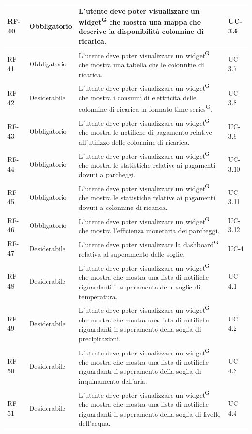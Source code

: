 \documentclass[8pt]{article}
\newcommand{\glossterm}[1]{#1\textsuperscript{G}} %
\begin{document}
\begin{longtable}{|>{\centering\arraybackslash}p{1.2cm}|>{\centering\arraybackslash}p{2cm}|>{\centering\arraybackslash}p{8.5cm}|>{\centering\arraybackslash}p{3cm}|}
            RF-40 & Obbligatorio & L'utente deve poter visualizzare un \glossterm{widget} che mostra una mappa che descrive la disponibilità colonnine di ricarica. & UC-3.6 \\ \hline
            RF-41 & Obbligatorio & L'utente deve poter visualizzare un \glossterm{widget} che mostra una tabella che le colonnine di ricarica. & UC-3.7 \\ \hline
            RF-42 & Desiderabile & L'utente deve poter visualizzare un \glossterm{widget} che mostra i consumi di elettricità delle colonnine di ricarica in formato \glossterm{time series}. & UC-3.8 \\ \hline
            RF-43 & Obbligatorio & L'utente deve poter visualizzare un \glossterm{widget} che mostra le notifiche di pagamento relative all'utilizzo delle colonnine di ricarica. & UC-3.9 \\ \hline
            RF-44 & Obbligatorio & L'utente deve poter visualizzare un \glossterm{widget} che mostra le statistiche relative ai pagamenti dovuti a parcheggi. & UC-3.10 \\ \hline
            RF-45 & Obbligatorio & L'utente deve poter visualizzare un \glossterm{widget} che mostra le statistiche relative ai pagamenti dovuti a colonnine di ricarica. & UC-3.11 \\ \hline
            RF-46 & Obbligatorio & L'utente deve poter visualizzare un \glossterm{widget} che mostra l'efficienza monetaria dei parcheggi. & UC-3.12 \\ \hline
            RF-47 & Desiderabile & L'utente deve poter visualizzare la \glossterm{dashboard} relativa al superamento delle soglie. & UC-4 \\ \hline
            RF-48 & Desiderabile & L'utente deve poter visualizzare un \glossterm{widget} che mostra che mostra una lista di notifiche riguardanti il superamento delle soglie di temperatura. & UC-4.1 \\ \hline
            RF-49 & Desiderabile & L'utente deve poter visualizzare un \glossterm{widget} che mostra che mostra una lista di notifiche riguardanti il superamento della soglia di precipitazioni. & UC-4.2 \\ \hline
            RF-50 & Desiderabile & L'utente deve poter visualizzare un \glossterm{widget} che mostra che mostra una lista di notifiche riguardanti il superamento della soglia di inquinamento dell'aria. & UC-4.3 \\ \hline
            RF-51 & Desiderabile & L'utente deve poter visualizzare un \glossterm{widget} che mostra che mostra una lista di notifiche riguardanti il superamento della soglia di livello dell'acqua. & UC-4.4 \\ \hline

\end{longtable}
\end{document}
